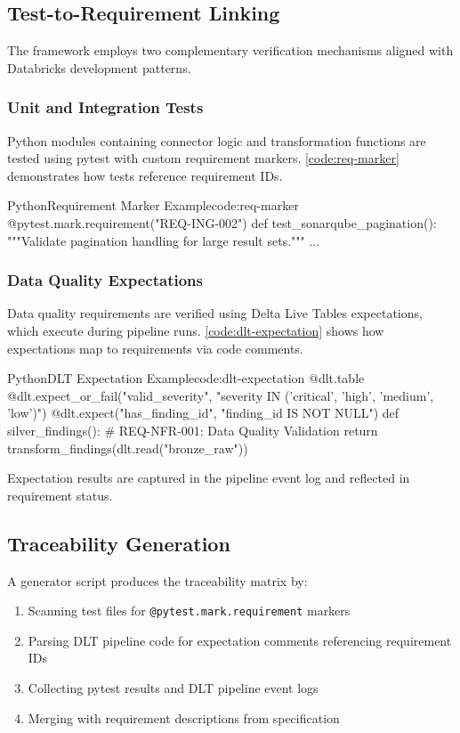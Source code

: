 \subsection{Test-to-Requirement Linking}

The framework employs two complementary verification mechanisms aligned with Databricks development patterns.

\subsubsection{Unit and Integration Tests}

Python modules containing connector logic and transformation functions are tested using pytest with custom requirement markers. \autoref{code:req-marker} demonstrates how tests reference requirement IDs.

\begin{code}{Python}{Requirement Marker Example}{code:req-marker}
@pytest.mark.requirement("REQ-ING-002")
def test_sonarqube_pagination():
    """Validate pagination handling for large result sets."""
    ...
\end{code}

\subsubsection{Data Quality Expectations}

Data quality requirements are verified using Delta Live Tables expectations, which execute during pipeline runs. \autoref{code:dlt-expectation} shows how expectations map to requirements via code comments.

\begin{code}{Python}{DLT Expectation Example}{code:dlt-expectation}
@dlt.table
@dlt.expect_or_fail("valid_severity", "severity IN ('critical', 'high', 'medium', 'low')")
@dlt.expect("has_finding_id", "finding_id IS NOT NULL")
def silver_findings():
    # REQ-NFR-001: Data Quality Validation
    return transform_findings(dlt.read("bronze_raw"))
\end{code}

Expectation results are captured in the pipeline event log and reflected in requirement status.

\subsection{Traceability Generation}

A generator script produces the traceability matrix by:
\begin{enumerate}
    \item Scanning test files for \texttt{@pytest.mark.requirement} markers
    \item Parsing DLT pipeline code for expectation comments referencing requirement IDs
    \item Collecting pytest results and DLT pipeline event logs
    \item Merging with requirement descriptions from specification
\end{enumerate}



